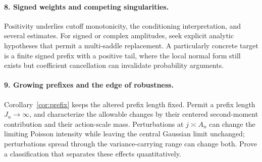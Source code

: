 \documentclass[11pt,a4paper]{article}
\numberwithin{equation}{section}
\theoremstyle{definition}
\theoremstyle{remark}
\begin{document}
\paragraph{8. Signed weights and competing singularities.}
Positivity underlies cutoff monotonicity, the conditioning interpretation,
and several estimates. For signed or complex amplitudes, seek explicit
analytic hypotheses that permit a multi-saddle replacement. A particularly
concrete target is a finite signed prefix with a positive tail, where the
local normal form still exists but coefficient cancellation can invalidate
probability arguments.

\paragraph{9. Growing prefixes and the edge of robustness.}
Corollary~\ref{cor:prefix} keeps the altered prefix length fixed. Permit a
prefix length \(J_n\to\infty\), and characterize the allowable changes by
their centered second-moment contribution and their action-scale mass.
Perturbations at \(j\asymp A_n\) can change the limiting Poisson intensity
while leaving the central Gaussian limit unchanged; perturbations spread
through the variance-carrying range can change both. Prove a classification
that separates these effects quantitatively.
\end{document}
